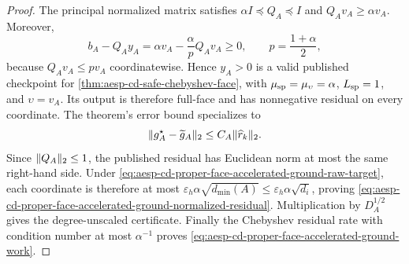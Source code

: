 \begin{proof}
The principal normalized matrix satisfies
\(\alpha I\preceq Q_A\preceq I\) and
\(Q_Av_A\geq\alpha v_A\).  Moreover,
\begin{equation*}
 b_A-Q_Ay_A
 =\alpha v_A-\frac{\alpha}{p}Q_Av_A\geq0,
 \qquad p=\frac{1+\alpha}{2},
\end{equation*}
because \(Q_Av_A\leq pv_A\) coordinatewise.  Hence \(y_A>0\) is a valid
published checkpoint for
\cref{thm:aesp-cd-safe-chebyshev-face}, with
\(\mu_{\rm sp}=\mu_\upsilon=\alpha\),
\(L_{\rm sp}=1\), and \(\upsilon=v_A\).  Its output is therefore full-face
and has nonnegative residual on every coordinate.  The theorem's error bound
specializes to
\begin{equation*}
 \lVert g_A^\star-\widetilde g_A\rVert_2
 \leq C_A\lVert\widehat r_k\rVert_2.
\end{equation*}
Since \(\lVert Q_A\rVert_2\leq1\), the published residual has Euclidean norm at
most the same right-hand side.  Under
\cref{eq:aesp-cd-proper-face-accelerated-ground-raw-target}, each coordinate
is therefore at most
\(\varepsilon_h\alpha\sqrt{d_{\min}(A)}
\leq\varepsilon_h\alpha\sqrt{d_i}\), proving
\cref{eq:aesp-cd-proper-face-accelerated-ground-normalized-residual}.
Multiplication by \(D_A^{1/2}\) gives the degree-unscaled certificate.
Finally the Chebyshev residual rate with condition number at most
\(\alpha^{-1}\) proves
\cref{eq:aesp-cd-proper-face-accelerated-ground-work}.
\end{proof}

